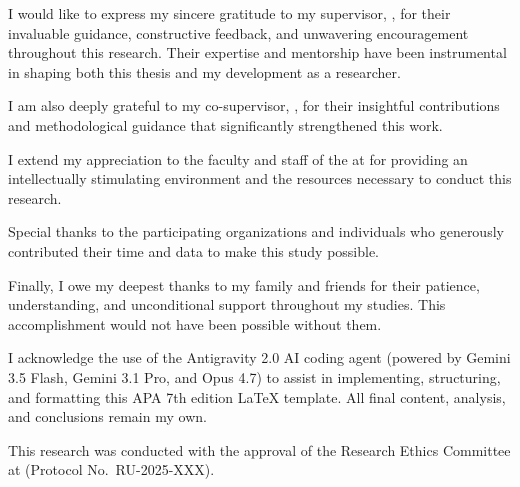 
I would like to express my sincere gratitude to my supervisor,
\thesisSupervisor, for their invaluable guidance, constructive feedback, and
unwavering encouragement throughout this research. Their expertise and
mentorship have been instrumental in shaping both this thesis and my
development as a researcher.

I am also deeply grateful to my co-supervisor, \thesisCoSupervisor, for their
insightful contributions and methodological guidance that significantly
strengthened this work.

I extend my appreciation to the faculty and staff of the \thesisDepartment{}
at \thesisUniversity{} for providing an intellectually stimulating environment
and the resources necessary to conduct this research.

Special thanks to the participating organizations and individuals who generously
contributed their time and data to make this study possible.

Finally, I owe my deepest thanks to my family and friends for their patience,
understanding, and unconditional support throughout my studies. This
accomplishment would not have been possible without them.

I acknowledge the use of the Antigravity 2.0 AI coding agent (powered by Gemini 3.5 Flash, Gemini 3.1 Pro, and Opus 4.7) to assist in implementing, structuring, and formatting this APA 7th edition LaTeX template. All final content, analysis, and conclusions remain my own.

This research was conducted with the approval of the Research Ethics Committee
at \thesisUniversity{} (Protocol No.\ RU-2025-XXX).

